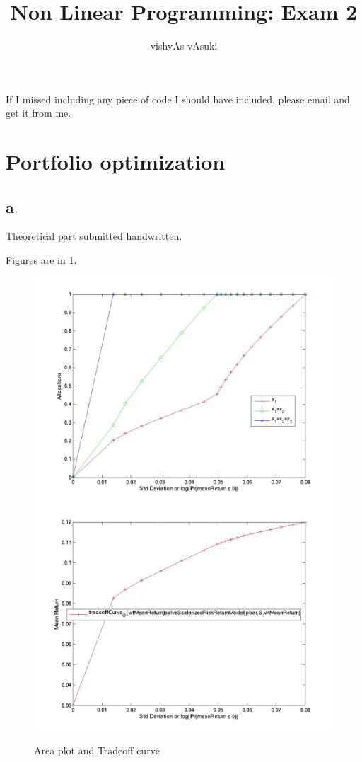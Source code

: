 \documentclass{article}
\title{Non Linear Programming: Exam 2}
\author{vishvAs vAsuki}
\begin{document}
\maketitle

\begin{rem}
 If I missed including any piece of code I should have included, please email and get it from me.
\end{rem}


\section{Portfolio optimization}
\subsection{a}
Theoretical part submitted handwritten.

Figures are in \ref{fig:results1a}.

\begin{figure}[h!]
\includegraphics[scale=0.15]{log/portfolio/allocationCurves_@(wtMeanReturn)solveScalarizedRiskReturnModel(pbar,S,wtMeanReturn)2010-05-09-16:02:24:882.jpg}
\includegraphics[scale=0.15]{log/portfolio/tradeoffCurve_@(wtMeanReturn)solveScalarizedRiskReturnModel(pbar,S,wtMeanReturn)2010-05-09-16:02:22:912.jpg}
\label{fig:results1a}
\caption{Area plot and Tradeoff curve}
\end{figure}
\end{document}
